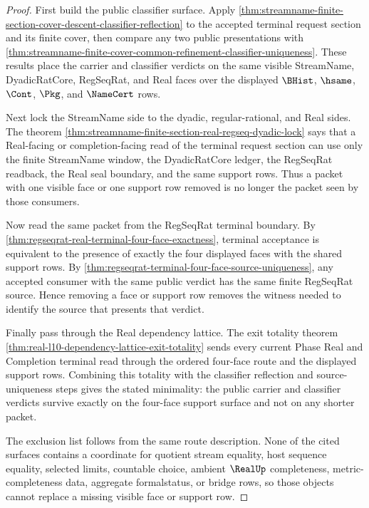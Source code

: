 \begin{proof}
First build the public classifier surface. Apply
\autoref{thm:streamname-finite-section-cover-descent-classifier-reflection} to
the accepted terminal request section and its finite cover, then compare any
two public presentations with
\autoref{thm:streamname-finite-cover-common-refinement-classifier-uniqueness}.
These results place the carrier and classifier verdicts on the same visible
StreamName, DyadicRatCore, RegSeqRat, and Real faces over the displayed
$\BHist$, $\hsame$, $\Cont$, $\Pkg$, and $\NameCert$ rows.

Next lock the StreamName side to the dyadic, regular-rational, and Real sides.
The theorem
\autoref{thm:streamname-finite-section-real-regseq-dyadic-lock} says that a
Real-facing or completion-facing read of the terminal request section can use
only the finite StreamName window, the DyadicRatCore ledger, the RegSeqRat
readback, the Real seal boundary, and the same support rows. Thus a packet
with one visible face or one support row removed is no longer the packet seen
by those consumers.

Now read the same packet from the RegSeqRat terminal boundary. By
\autoref{thm:regseqrat-real-terminal-four-face-exactness}, terminal acceptance
is equivalent to the presence of exactly the four displayed faces with the
shared support rows. By
\autoref{thm:regseqrat-terminal-four-face-source-uniqueness}, any accepted
consumer with the same public verdict has the same finite RegSeqRat source.
Hence removing a face or support row removes the witness needed to identify the
source that presents that verdict.

Finally pass through the Real dependency lattice. The exit totality theorem
\autoref{thm:real-l10-dependency-lattice-exit-totality} sends every current
Phase Real and Completion terminal read through the ordered four-face route and
the displayed support rows. Combining this totality with the classifier
reflection and source-uniqueness steps gives the stated minimality: the public
carrier and classifier verdicts survive exactly on the four-face support
surface and not on any shorter packet.

The exclusion list follows from the same route description. None of the cited
surfaces contains a coordinate for quotient stream equality, host sequence
equality, selected limits, countable choice, ambient $\RealUp$ completeness,
metric-completeness data, aggregate formalstatus, or bridge rows, so those
objects cannot replace a missing visible face or support row.
\end{proof}

